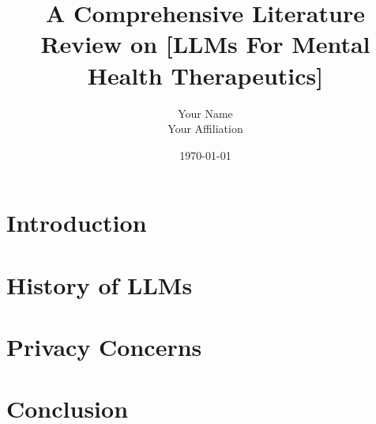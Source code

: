 \documentclass[12pt, letterpaper]{article} %
\title{A Comprehensive Literature Review on [LLMs For ​Mental Health Therapeutics​]}
\author{Your Name\\Your Affiliation}
\date{\today}
\begin{document}
\maketitle  %

\begin{abstract}
\end{abstract}

\tableofcontents %

\section{Introduction}

\section{History of LLMs}

\section{Privacy Concerns}

\section{Conclusion}

\end{document}
